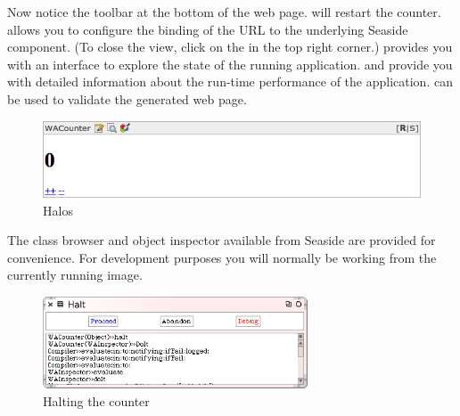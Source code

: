 \documentclass[a4paper,10pt,twoside]{book}
\begin{document}
Now notice the toolbar at the bottom of the web page.
 will restart the counter.
 allows you to configure the binding of the URL to the underlying Seaside component.
(To close the  view, click on the  in the top right corner.)
 provides you with an interface to explore the state of the running application.
 and  provide you with detailed information about the run-time performance of the application.
 can be used to validate the generated web page.

\begin{figure}[ht]
\begin{center}
\includegraphics[width=\textwidth]{counterHalos}
\caption{Halos}
\label{fig:counterHalos}
\end{center}
\end{figure}


The class browser and object inspector available from Seaside are provided for convenience. For development purposes you will normally be working from the currently running image.

\begin{figure}[ht]
\begin{center}
\includegraphics[width=0.7\textwidth]{haltingCounter}
\caption{Halting the counter}
\label{fig:haltingCounter}
\end{center}
\end{figure}
\end{document}
